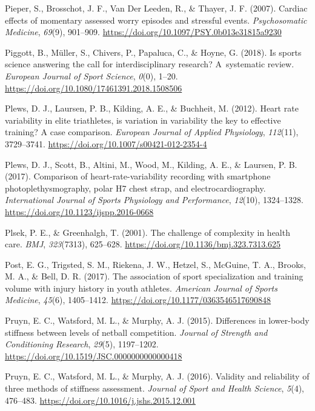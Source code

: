 \documentclass[
  english,
  man,floatsintext]{apa6}
\begin{document}
\leavevmode\hypertarget{ref-Pieper2007}{}%
Pieper, S., Brosschot, J. F., Van Der Leeden, R., \& Thayer, J. F. (2007). Cardiac effects of momentary assessed worry episodes and stressful events. \emph{Psychosomatic Medicine}, \emph{69}(9), 901--909. \url{https://doi.org/10.1097/PSY.0b013e31815a9230}

\leavevmode\hypertarget{ref-Piggott2018}{}%
Piggott, B., Müller, S., Chivers, P., Papaluca, C., \& Hoyne, G. (2018). Is sports science answering the call for interdisciplinary research? A~systematic review. \emph{European Journal of Sport Science}, \emph{0}(0), 1--20. \url{https://doi.org/10.1080/17461391.2018.1508506}

\leavevmode\hypertarget{ref-Plews2012}{}%
Plews, D. J., Laursen, P. B., Kilding, A. E., \& Buchheit, M. (2012). Heart rate variability in elite triathletes, is variation in variability the key to effective training? A case comparison. \emph{European Journal of Applied Physiology}, \emph{112}(11), 3729--3741. \url{https://doi.org/10.1007/s00421-012-2354-4}

\leavevmode\hypertarget{ref-Plews2017}{}%
Plews, D. J., Scott, B., Altini, M., Wood, M., Kilding, A. E., \& Laursen, P. B. (2017). Comparison of heart-rate-variability recording with smartphone photoplethysmography, polar H7 chest strap, and electrocardiography. \emph{International Journal of Sports Physiology and Performance}, \emph{12}(10), 1324--1328. \url{https://doi.org/10.1123/ijspp.2016-0668}

\leavevmode\hypertarget{ref-Plsek2001}{}%
Plsek, P. E., \& Greenhalgh, T. (2001). The challenge of complexity in health care. \emph{BMJ}, \emph{323}(7313), 625--628. \url{https://doi.org/10.1136/bmj.323.7313.625}

\leavevmode\hypertarget{ref-Post2017}{}%
Post, E. G., Trigsted, S. M., Riekena, J. W., Hetzel, S., McGuine, T. A., Brooks, M. A., \& Bell, D. R. (2017). The association of sport specialization and training volume with injury history in youth athletes. \emph{American Journal of Sports Medicine}, \emph{45}(6), 1405--1412. \url{https://doi.org/10.1177/0363546517690848}

\leavevmode\hypertarget{ref-Pruyn2015}{}%
Pruyn, E. C., Watsford, M. L., \& Murphy, A. J. (2015). Differences in lower-body stiffness between levels of netball competition. \emph{Journal of Strength and Conditioning Research}, \emph{29}(5), 1197--1202. \url{https://doi.org/10.1519/JSC.0000000000000418}

\leavevmode\hypertarget{ref-Pruyn2016}{}%
Pruyn, E. C., Watsford, M. L., \& Murphy, A. J. (2016). Validity and reliability of three methods of stiffness assessment. \emph{Journal of Sport and Health Science}, \emph{5}(4), 476--483. \url{https://doi.org/10.1016/j.jshs.2015.12.001}
\end{document}
